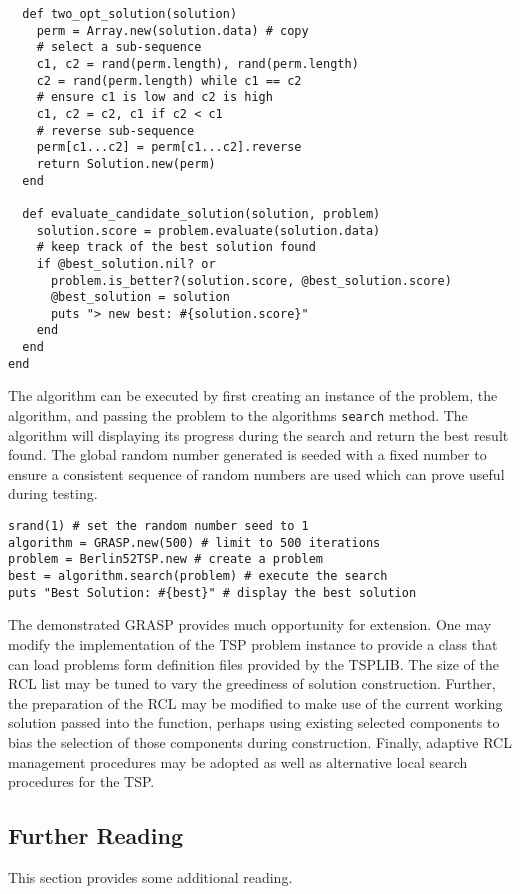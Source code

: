 \begin{lstlisting}
  def two_opt_solution(solution)
    perm = Array.new(solution.data) # copy
    # select a sub-sequence
    c1, c2 = rand(perm.length), rand(perm.length)
    c2 = rand(perm.length) while c1 == c2
    # ensure c1 is low and c2 is high
    c1, c2 = c2, c1 if c2 < c1
    # reverse sub-sequence
    perm[c1...c2] = perm[c1...c2].reverse
    return Solution.new(perm)
  end

  def evaluate_candidate_solution(solution, problem)
    solution.score = problem.evaluate(solution.data)
    # keep track of the best solution found
    if @best_solution.nil? or
      problem.is_better?(solution.score, @best_solution.score)
      @best_solution = solution
      puts "> new best: #{solution.score}"               
    end
  end
end
\end{lstlisting}

The algorithm can be executed by first creating an instance of the problem, the algorithm, and passing the problem to the algorithms \texttt{search} method. The algorithm will displaying its progress during the search and return the best result found. The global random number generated is seeded with a fixed number to ensure a consistent sequence of random numbers are used which can prove useful during testing.

\begin{lstlisting}
srand(1) # set the random number seed to 1
algorithm = GRASP.new(500) # limit to 500 iterations 
problem = Berlin52TSP.new # create a problem
best = algorithm.search(problem) # execute the search
puts "Best Solution: #{best}" # display the best solution
\end{lstlisting}

The demonstrated GRASP provides much opportunity for extension. One may modify the implementation of the TSP problem instance to provide a class that can load problems form definition files provided by the TSPLIB. The size of the RCL list may be tuned to vary the greediness of solution construction. Further, the preparation of the RCL may be modified to make use of the current working solution passed into the function, perhaps using existing selected components to bias the selection of those components during construction. Finally, adaptive RCL management procedures may be adopted as well as alternative local search procedures for the TSP.

\subsection{Further Reading}
This section provides some additional reading.

